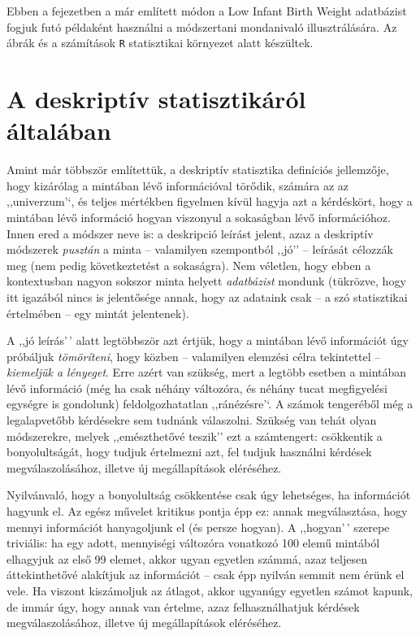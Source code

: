 \documentclass[
]{book}
\begin{document}
Ebben a fejezetben a már említett módon a Low Infant Birth Weight adatbázist fogjuk futó példaként használni a módszertani mondanivaló illusztrálására. Az ábrák és a számítások \texttt{R} statisztikai környezet alatt készültek.

\hypertarget{deskriptivaltalaban}{%
\section{A deskriptív statisztikáról általában}\label{deskriptivaltalaban}}

Amint már többször említettük, a deskriptív statisztika definíciós jellemzője, hogy kizárólag a mintában lévő információval törődik, számára az az ,,univerzum'`, és teljes mértékben figyelmen kívül hagyja azt a kérdéskört, hogy a mintában lévő információ hogyan viszonyul a sokaságban lévő információhoz. Innen ered a módszer neve is: a deskripció leírást jelent, azaz a deskriptív módszerek \emph{pusztán} a minta -- valamilyen szempontból ,,jó'' -- leírását célozzák meg (nem pedig következtetést a sokaságra). Nem véletlen, hogy ebben a kontextusban nagyon sokszor minta helyett \emph{adatbázist} mondunk (tükrözve, hogy itt igazából nincs is jelentősége annak, hogy az adataink csak -- a szó statisztikai értelmében -- egy mintát jelentenek).

A ,,jó leírás'\,' alatt legtöbbször azt értjük, hogy a mintában lévő információt úgy próbáljuk \emph{tömöríteni}, hogy közben -- valamilyen elemzési célra tekintettel -- \emph{kiemeljük a lényeget}. Erre azért van szükség, mert a legtöbb esetben a mintában lévő információ (még ha csak néhány változóra, és néhány tucat megfigyelési egységre is gondolunk) feldolgozhatatlan ,,ránézésre'`. A számok tengeréből még a legalapvetőbb kérdésekre sem tudnánk válaszolni. Szükség van tehát olyan módszerekre, melyek ,,emészthetővé teszik'' ezt a számtengert: csökkentik a bonyolultságát, hogy tudjuk értelmezni azt, fel tudjuk használni kérdések megválaszolásához, illetve új megállapítások eléréséhez.

Nyilvánvaló, hogy a bonyolultság csökkentése csak úgy lehetséges, ha információt hagyunk el. Az egész művelet kritikus pontja épp ez: annak megválasztása, hogy mennyi információt hanyagoljunk el (és persze hogyan). A ,,hogyan'\,' szerepe triviális: ha egy adott, mennyiségi változóra vonatkozó 100 elemű mintából elhagyjuk az első 99 elemet, akkor ugyan egyetlen számmá, azaz teljesen áttekinthetővé alakítjuk az információt -- csak épp nyilván semmit nem érünk el vele. Ha viszont kiszámoljuk az átlagot, akkor ugyanúgy egyetlen számot kapunk, de immár úgy, hogy annak van értelme, azaz felhasználhatjuk kérdések megválaszolásához, illetve új megállapítások eléréséhez.
\end{document}

